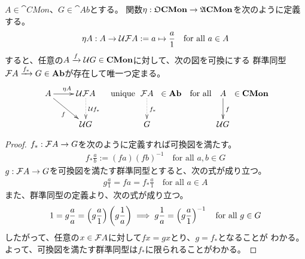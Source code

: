 	\begin{proposition}[分数群の普遍性]\label{prop:分数群の普遍性} %
		$A\in\cat{CMon}$、$G\in\cat{Ab}$とする。
		関数$\eta:{\mathfrak{O}}{\mathbf{CMon}}\to{\mathfrak{A}}{\mathbf{CMon}}$を次のように定義する。
		\begin{equation*}\begin{split}
			\eta A: A\to{\mathcal{U}}{\mathcal{F}} A := a \mapsto \frac{a}{1} 
			\quad\text{for all } a\in A
		\end{split}\end{equation*}
		すると、任意の$A\xrightarrow[{}]{f}{\mathcal{U}} G\in{\mathbf{CMon}}$に対して、次の図を可換にする
		群準同型${\mathcal{F}} A\xrightarrow[{}]{f_*}G\in{\mathbf{Ab}}$が存在して唯一つ定まる。
		\begin{equation*}\begin{split}
			\xymatrix{
				A \ar[r]^{\eta A} \ar[rd]_f & \clU\clF A \ar@{.>}[d]^{\clU f_*} \\
				& \clU G
			} \quad\text{unique }\xymatrix{
				\clF A \ar@{.>}[d]^{f_*} \\ G
			}\in\cat{Ab} \quad\text{for all } \xymatrix{
				A\ar[d]^f \\ \clU G
			} \in\cat{CMon}
		\end{split}\end{equation*}\EOP
	\end{proposition} %
	\begin{proof} %
		$f_*:{\mathcal{F}} A\to G$を次のように定義すれば可換図を満たす。
		\begin{equation*}\begin{split}
			f_*\frac{a}{b} := (fa)(fb)^{-1} \quad\text{for all } a,b\in G
		\end{split}\end{equation*}
		$g:{\mathcal{F}} A\to G$を可換図を満たす群準同型とすると、次の式が成り立つ。
		\begin{equation*}\begin{split}
			g\frac{a}{1} = fa = f_*\frac{a}{1} \quad\text{for all } a\in A
		\end{split}\end{equation*}
		また、群準同型の定義より、次の式が成り立つ。
		\begin{equation*}\begin{split}
			1 = g\frac{a}{a} = \mathinner{\left({g\frac{a}{1}}\right)}\mathinner{\left({g\frac{1}{a}}\right)}
			\implies g\frac{1}{a} = \mathinner{\left({g\frac{a}{1}}\right)}^{-1}
			\quad\text{for all } g\in G
		\end{split}\end{equation*}
		したがって、任意の$x\in{\mathcal{F}} A$に対して$fx=gx$とり、$g=f_*$となることが
		わかる。よって、可換図を満たす群準同型は$f_*$に限られることがわかる。
	\end{proof} %

